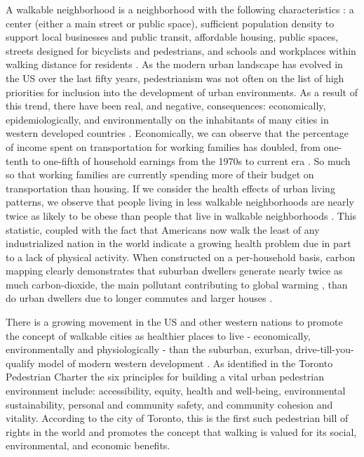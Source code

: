 \documentclass{llncs}
\begin{document}
A walkable neighborhood is a neighborhood with the following characteristics : a center (either a main street or public space), sufficient population density to support local businesses and public transit, affordable housing, public spaces, streets designed for bicyclists and pedestrians, and schools and workplaces within walking distance for residents \cite{wal2018walkable}. As the modern urban landscape has evolved in the US over the last fifty years, pedestrianism was not often on the list of high priorities for inclusion into the development of urban environments. As a result of this trend, there have been real, and negative, consequences: economically, epidemiologically, and environmentally on the inhabitants of many cities in western developed countries \cite{speck2013walkable}. Economically, we can observe that the percentage of income spent on transportation for working families has doubled, from one-tenth to one-fifth of household earnings from the 1970s to current era \cite{speck2013walkable}. So much so that working families are currently spending more of their budget on transportation than housing. If we consider the health effects of urban living patterns, we observe that people living in less walkable neighborhoods are nearly twice as likely to be obese than people that live in walkable neighborhoods \cite{speck2013walkable}. This statistic, coupled with the fact that Americans now walk the least of any industrialized nation in the world \cite{lee2014suburban} indicate a growing health problem due in part to a lack of physical activity. When constructed on a per-household basis, carbon mapping clearly demonstrates that suburban dwellers generate nearly twice as much carbon-dioxide, the main pollutant contributing to global warming \cite{climatendclimate}, than do urban dwellers due to longer commutes and larger houses \cite{speck2013walkable}.

There is a growing movement in the US and other western nations to promote the concept of walkable cities as healthier places to live - economically, environmentally and physiologically - than the suburban, exurban, drive-till-you-qualify model of modern western development \cite{leyden2003social} \cite{steffen2008worldchanging} \cite{doyle2006active}. As identified in the Toronto Pedestrian Charter \cite{toronto2002toronto} the six principles for building a vital urban pedestrian environment include: accessibility, equity, health and well-being, environmental sustainability, personal and community safety, and community cohesion and vitality. According to the city of Toronto, this is the first such pedestrian bill of rights in the world and promotes the concept that walking is valued for its social, environmental, and economic benefits.
\end{document}
